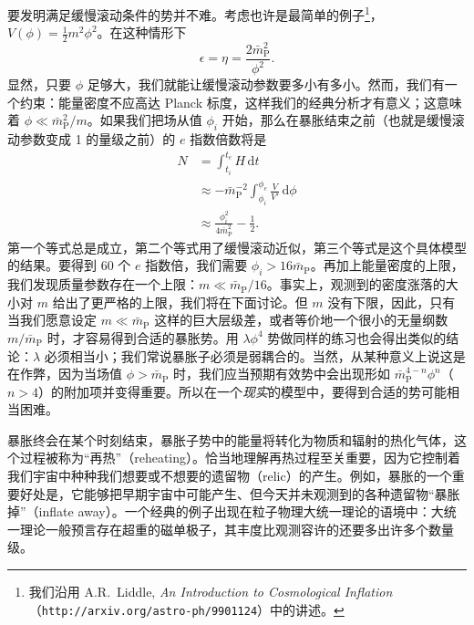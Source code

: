 要发明满足缓慢滚动条件的势并不难。考虑也许是最简单的例子\footnote{我们沿用 A.R.~Liddle, \emph{An Introduction to Cosmological Inflation}（\texttt{http://arxiv.org/astro-ph/9901124}）中的讲述。}，$V(\phi)=\frac{1}{2}m^{2}\phi^{2}$。在这种情形下
\begin{equation*}
\epsilon = \eta = \frac{2\bar{m}_{\mathrm{P}}^{2}}{\phi^{2}}.
\tag{8.195}
\end{equation*}
显然，只要 $\phi$ 足够大，我们就能让缓慢滚动参数要多小有多小。然而，我们有一个约束：能量密度不应高达 Planck 标度，这样我们的经典分析才有意义；这意味着 $\phi\ll\bar{m}_{\mathrm{P}}^{2}/m$。如果我们把场从值 $\phi_{i}$ 开始，那么在暴胀结束之前（也就是缓慢滚动参数变成 1 的量级之前）的 $e$ 指数倍数将是
\begin{equation*}
\begin{aligned}
N &= \int_{t_{i}}^{t_{e}} H\,\mathrm{d}t \\
&\approx -\bar{m}_{\mathrm{P}}^{-2}\int_{\phi_{i}}^{\phi_{e}}\frac{V}{V'}\,\mathrm{d}\phi \\
&\approx \frac{\phi_{i}^{2}}{4\bar{m}_{\mathrm{P}}^{2}} - \frac{1}{2}.
\end{aligned}
\tag{8.196}
\end{equation*}
第一个等式总是成立，第二个等式用了缓慢滚动近似，第三个等式是这个具体模型的结果。要得到 60 个 $e$ 指数倍，我们需要 $\phi_{i}>16\bar{m}_{\mathrm{P}}$。再加上能量密度的上限，我们发现质量参数存在一个上限：$m\ll\bar{m}_{\mathrm{P}}/16$。事实上，观测到的密度涨落的大小对 $m$ 给出了更严格的上限，我们将在下面讨论。但 $m$ 没有下限，因此，只有当我们愿意设定 $m\ll\bar{m}_{\mathrm{P}}$ 这样的巨大层级差，或者等价地一个很小的无量纲数 $m/\bar{m}_{\mathrm{P}}$ 时，才容易得到合适的暴胀势。用 $\lambda\phi^{4}$ 势做同样的练习也会得出类似的结论：$\lambda$ 必须相当小；我们常说暴胀子必须是弱耦合的。当然，从某种意义上说这是在作弊，因为当场值 $\phi>\bar{m}_{\mathrm{P}}$ 时，我们应当预期有效势中会出现形如 $\bar{m}_{\mathrm{P}}^{4-n}\phi^{n}$（$n>4$）的附加项并变得重要。所以在一个\emph{现实}的模型中，要得到合适的势可能相当困难。

暴胀终会在某个时刻结束，暴胀子势中的能量将转化为物质和辐射的热化气体，这个过程被称为“再热”（reheating）。恰当地理解再热过程至关重要，因为它控制着我们宇宙中种种我们想要或不想要的遗留物（relic）的产生。例如，暴胀的一个重要好处是，它能够把早期宇宙中可能产生、但今天并未观测到的各种遗留物“暴胀掉”（inflate away）。一个经典的例子出现在粒子物理大统一理论的语境中：大统一理论一般预言存在超重的磁单极子，其丰度比观测容许的还要多出许多个数量级。

